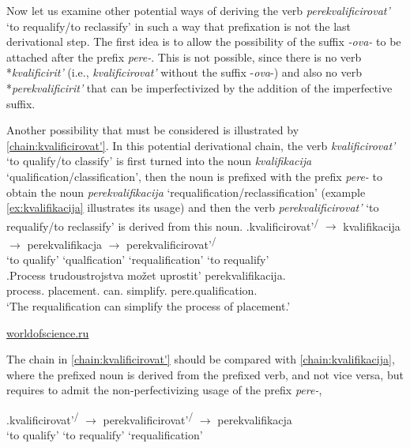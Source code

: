 Now let us examine other potential ways of deriving the verb \textit{perekvalificirovat'} `to requalify/to reclassify' in such a way that prefixation is not the last derivational step. The first idea is to allow the possibility of the suffix \textit{-ova-} to be attached after the prefix \textit{pere-}. This is not possible, since there is no verb *\textit{kvalificirit'} (i.e., \textit{kvalificirovat'} without the suffix -\textit{ova}-) and also no verb  *\textit{perekvalificirit'} that can be imperfectivized by the addition of the imperfective suffix.

Another possibility that must be considered is illustrated by \ref{chain:kvalificirovat'}. In this potential derivational chain, the verb \textit{kvalificirovat'} `to qualify/to classify' is first turned into the noun \textit{kvalifikacija} `qualification\slash classification', then the noun is prefixed with the prefix \textit{pere-} to obtain the noun \textit{perekvalifikacija}  `requalification/reclassification' (example \ref{ex:kvalifikacija} illustrates its usage) and then the verb \textit{perekvalificirovat'} `to requalify/to reclassify' is derived from this noun. 
\exg.\label{chain:kvalificirovat'}kvalificirovat'\textsuperscript{\PF\slash\IPF} {$\rightarrow$} kvalifikacija {$\rightarrow$} perekvalifikacja {$\rightarrow$} {perekvalificirovat'\textsuperscript{\PF\slash\IPF}}\\
{`to qualify'} {} {`qualfication'} {} {`requalification'} {} {`to requalify'}\\

\exg.\label{ex:kvalifikacija}Process trudoustrojstva mo\v{z}et uprostit' perekvalifikacija.\\
process. placement. can. simplify. pere.qualification.\\
\trans `The requalification can simplify the process of placement.'
\begin{flushright}
\vspace{-0.5em}
\url{worldofscience.ru}
\end{flushright}

The chain in \ref{chain:kvalificirovat'} should be compared with \ref{chain:kvalifikacija}, where the prefixed noun is derived from the prefixed verb, and not vice versa, but requires to admit the non-perfectivizing usage of the prefix \textit{pere-},

\exg.\label{chain:kvalifikacija}kvalificirovat'\textsuperscript{\PF\slash\IPF} {$\rightarrow$} {perekvalificirovat'\textsuperscript{\PF\slash\IPF}} {$\rightarrow$} perekvalifikacja\\
{`to qualify'} {} {`to requalify'} {} {`requalification'}\\

